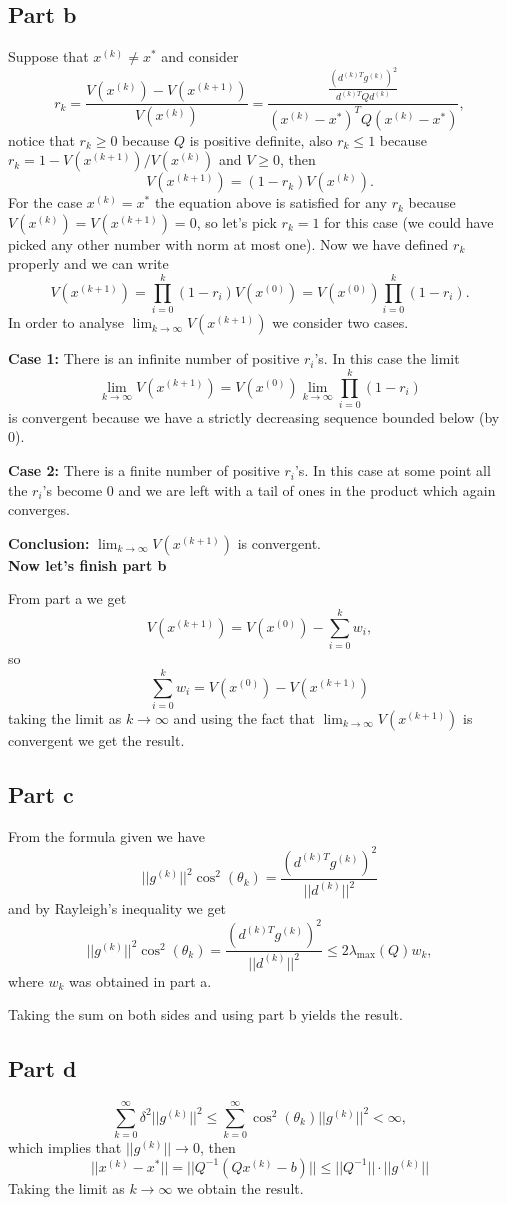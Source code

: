 \documentclass{article}
\begin{document}
\subsection*{Part b}
Suppose that $x^{(k)}\neq x^*$ and consider
\[
r_k=\frac{V(x^{(k)}) -V(x^{(k+1)})}{V(x^{(k)})}
=\frac{\frac{\left(d^{(k)T}g^{(k)}\right)^2}{d^{(k)T}Qd^{(k)}}}{(x^{(k)}-x^*)^TQ(x^{(k)}-x^*)},
\]
notice that $r_k\geq0$ because $Q$ is positive definite, also $r_k\leq 1$ because\\
$r_k=1-V(x^{(k+1)})/V(x^{(k)})$ and $V\geq 0$, then
\[
V(x^{(k+1)})=(1-r_k)V(x^{(k)}).
\]
For the case $x^{(k)}=x^*$ the equation above is satisfied for any $r_k$
because $V(x^{(k)})=V(x^{(k+1)})=0$, so let's pick $r_k=1$ for this case (we
could have picked any other number with norm at most one). Now we have defined
$r_k$ properly and we can write
\[
V(x^{(k+1)})=\prod_{i=0}^k(1-r_i)V(x^{(0)})=V(x^{(0)})\prod_{i=0}^k(1-r_i).
\]
In order to analyse $\lim_{k\to\infty}V(x^{(k+1)})$ we consider two cases.

\textbf{Case 1:} There is an infinite number of positive $r_i$'s. In this case
the limit
\[
	\lim_{k\to\infty}V(x^{(k+1)})=V(x^{(0)})\lim_{k\to\infty}\prod_{i=0}^k(1-r_i)
\]
is convergent because we have a strictly decreasing sequence bounded below (by
0).

\textbf{Case 2:} There is a finite number of positive $r_i$'s. In this case at
some point all the $r_i$'s become 0 and we are left with a tail of ones in the
product which again converges.

\textbf{Conclusion:} $\lim_{k\to\infty}V(x^{(k+1)})$ is convergent.\\
\textbf{Now let's finish part b}

From part a we get
\[
V(x^{(k+1)})=V(x^{(0)})-\sum_{i=0}^kw_i,
\]
so
\[
\sum_{i=0}^kw_i=V(x^{(0)})-V(x^{(k+1)})
\]
taking the limit as $k\to\infty$ and using the fact that
$\lim_{k\to\infty}V(x^{(k+1)})$ is convergent we get the result.
\subsection*{Part c}
From the formula given we have
\[
||g^{(k)}||^2\cos^2(\theta_k)=\frac{(d^{(k)T}g^{(k)})^2}{||d^{(k)}||^2}
\]
and by Rayleigh's inequality we get
\[
||g^{(k)}||^2\cos^2(\theta_k)=\frac{(d^{(k)T}g^{(k)})^2}{||d^{(k)}||^2}
\leq2\lambda_{\max}(Q)w_k,
\]
where $w_k$ was obtained in part a.

Taking the sum on both sides and using part b yields the result.
\subsection*{Part d}
\[
	\sum_{k=0}^\infty \delta^2||g^{(k)}||^2\leq
	\sum_{k=0}^\infty \cos^2(\theta_k)||g^{(k)}||^2
	<\infty,
\]
which implies that $||g^{(k)}||\to 0$, then
\[
	||x^{(k)}-x^*||=||Q^{-1}(Qx^{(k)}-b)||\leq||Q^{-1}||\cdot||g^{(k)}||
\]
Taking the limit as $k\to \infty$ we obtain the result.
\end{document}
